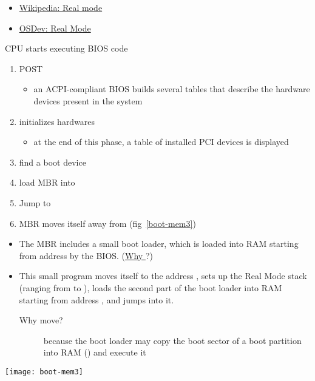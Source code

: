 \begin{itemize}
\item \href{http://en.wikipedia.org/wiki/Real_mode}{Wikipedia: Real mode}
\item \href{http://wiki.osdev.org/Real_Mode}{OSDev: Real Mode}
\end{itemize}

\begin{frame}{CPU starts executing BIOS code}
  \begin{enumerate}
  \item POST
    \begin{itemize}
    \item an ACPI-compliant BIOS builds several tables that describe the hardware devices
      present in the system
    \end{itemize}
  \item initializes hardwares
    \begin{itemize}
    \item at the end of this phase, a table of installed PCI devices is displayed
    \end{itemize}
  \item find a boot device
  \item load MBR into 
  \item Jump to 
  \item MBR moves itself away from  (fig~\ref{boot-mem3})
  \end{enumerate}
  \begin{center}
     
  \end{center}
\end{frame}

\begin{varwidth}{.65\textwidth}
  \begin{itemize}
  \item The MBR includes a small boot loader, which is loaded into RAM starting from
    address  by the
    BIOS. (\href{http://www.glamenv-septzen.net/en/view/6}{Why }?)
  \item This small program moves itself to the address , sets up the Real
    Mode stack (ranging from  to ), loads the second
    part of the boot loader into RAM starting from address , and jumps
    into it.
    \begin{description}
    \item[Why move?] because the boot loader may copy the boot sector of a boot partition
      into RAM () and execute it
    \end{description}
  \end{itemize}
\end{varwidth}\hfill
\begin{varwidth}{.3\textwidth}
  \texttt{[image: boot-mem3]}
\end{varwidth}

